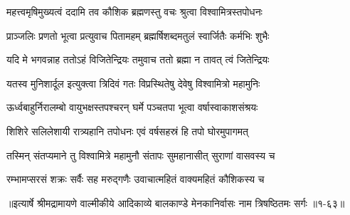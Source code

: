 \twolineshloka
{महत्त्वमृषिमुख्यत्वं ददामि तव कौशिक}
{ब्रह्मणस्तु वचः श्रुत्वा विश्वामित्रस्तपोधनः} %

\twolineshloka
{प्राञ्जलिः प्रणतो भूत्वा प्रत्युवाच पितामहम्}
{ब्रह्मर्षिशब्दमतुलं स्वार्जितैः कर्मभिः शुभैः} %

\twolineshloka
{यदि मे भगवन्नाह ततोऽहं विजितेन्द्रियः}
{तमुवाच ततो ब्रह्मा न तावत् त्वं जितेन्द्रियः} %

\twolineshloka
{यतस्व मुनिशार्दूल इत्युक्त्वा त्रिदिवं गतः}
{विप्रस्थितेषु देवेषु विश्वामित्रो महामुनिः} %

\twolineshloka
{ऊर्ध्वबाहुर्निरालम्बो वायुभक्षस्तपश्चरन्}
{घर्मे पञ्चतपा भूत्वा वर्षास्वाकाशसंश्रयः} %

\twolineshloka
{शिशिरे सलिलेशायी रात्र्यहानि तपोधनः}
{एवं वर्षसहस्रं हि तपो घोरमुपागमत्} %

\twolineshloka
{तस्मिन् संतप्यमाने तु विश्वामित्रे महामुनौ}
{संतापः सुमहानासीत् सुराणां वासवस्य च} %

\twolineshloka
{रम्भामप्सरसं शक्रः सर्वैः सह मरुद्गणैः}
{उवाचात्महितं वाक्यमहितं कौशिकस्य च} %


॥इत्यार्षे श्रीमद्रामायणे वाल्मीकीये आदिकाव्ये बालकाण्डे मेनकानिर्वासः नाम त्रिषष्ठितमः सर्गः ॥१-६३॥
